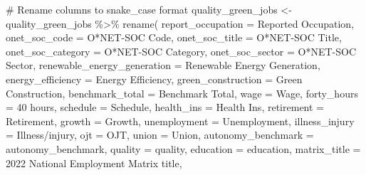 \documentclass[
  letterpaper,
  DIV=11,
  numbers=noendperiod]{scrartcl}
\newenvironment{Shaded}{\begin{snugshade}}{\end{snugshade}}
\newcommand{\AttributeTok}[1]{\textcolor[rgb]{0.40,0.45,0.13}{#1}}
\newcommand{\CommentTok}[1]{\textcolor[rgb]{0.37,0.37,0.37}{#1}}
\newcommand{\FunctionTok}[1]{\textcolor[rgb]{0.28,0.35,0.67}{#1}}
\newcommand{\NormalTok}[1]{\textcolor[rgb]{0.00,0.23,0.31}{#1}}
\newcommand{\OtherTok}[1]{\textcolor[rgb]{0.00,0.23,0.31}{#1}}
\newcommand{\SpecialCharTok}[1]{\textcolor[rgb]{0.37,0.37,0.37}{#1}}
\newcommand{\StringTok}[1]{\textcolor[rgb]{0.13,0.47,0.30}{#1}}
\begin{document}
\begin{Shaded}
\begin{Highlighting}[]
\CommentTok{\# Rename columns to snake\_case format}
\NormalTok{quality\_green\_jobs }\OtherTok{\textless{}{-}}\NormalTok{ quality\_green\_jobs }\SpecialCharTok{\%\textgreater{}\%}
  \FunctionTok{rename}\NormalTok{(}
    \AttributeTok{report\_occupation =} \StringTok{\textasciigrave{}}\AttributeTok{Reported Occupation}\StringTok{\textasciigrave{}}\NormalTok{,}
    \AttributeTok{onet\_soc\_code =} \StringTok{\textasciigrave{}}\AttributeTok{O*NET{-}SOC Code}\StringTok{\textasciigrave{}}\NormalTok{,}
    \AttributeTok{onet\_soc\_title =} \StringTok{\textasciigrave{}}\AttributeTok{O*NET{-}SOC Title}\StringTok{\textasciigrave{}}\NormalTok{,}
    \AttributeTok{onet\_soc\_category =} \StringTok{\textasciigrave{}}\AttributeTok{O*NET{-}SOC Category}\StringTok{\textasciigrave{}}\NormalTok{,}
    \AttributeTok{onet\_soc\_sector =} \StringTok{\textasciigrave{}}\AttributeTok{O*NET{-}SOC Sector}\StringTok{\textasciigrave{}}\NormalTok{,}
    \AttributeTok{renewable\_energy\_generation =} \StringTok{\textasciigrave{}}\AttributeTok{Renewable Energy Generation}\StringTok{\textasciigrave{}}\NormalTok{,}
    \AttributeTok{energy\_efficiency =} \StringTok{\textasciigrave{}}\AttributeTok{Energy Efficiency}\StringTok{\textasciigrave{}}\NormalTok{,}
    \AttributeTok{green\_construction =} \StringTok{\textasciigrave{}}\AttributeTok{Green Construction}\StringTok{\textasciigrave{}}\NormalTok{,}
    \AttributeTok{benchmark\_total =} \StringTok{\textasciigrave{}}\AttributeTok{Benchmark Total}\StringTok{\textasciigrave{}}\NormalTok{,}
    \AttributeTok{wage =}\NormalTok{ Wage,}
    \AttributeTok{forty\_hours =} \StringTok{\textasciigrave{}}\AttributeTok{40 hours}\StringTok{\textasciigrave{}}\NormalTok{,}
    \AttributeTok{schedule =}\NormalTok{ Schedule,}
    \AttributeTok{health\_ins =} \StringTok{\textasciigrave{}}\AttributeTok{Health Ins}\StringTok{\textasciigrave{}}\NormalTok{,}
    \AttributeTok{retirement =}\NormalTok{ Retirement,}
    \AttributeTok{growth =}\NormalTok{ Growth,}
    \AttributeTok{unemployment =}\NormalTok{ Unemployment,}
    \AttributeTok{illness\_injury =} \StringTok{\textasciigrave{}}\AttributeTok{Illness/injury}\StringTok{\textasciigrave{}}\NormalTok{,}
    \AttributeTok{ojt =}\NormalTok{ OJT,}
    \AttributeTok{union =}\NormalTok{ Union,}
    \AttributeTok{autonomy\_benchmark =}\NormalTok{ autonomy\_benchmark,}
    \AttributeTok{quality =}\NormalTok{ quality,}
    \AttributeTok{education =}\NormalTok{ education,}
    \AttributeTok{matrix\_title =} \StringTok{\textasciigrave{}}\AttributeTok{2022 National Employment Matrix title}\StringTok{\textasciigrave{}}\NormalTok{,}

\end{Highlighting}
\end{Shaded}
\end{document}
